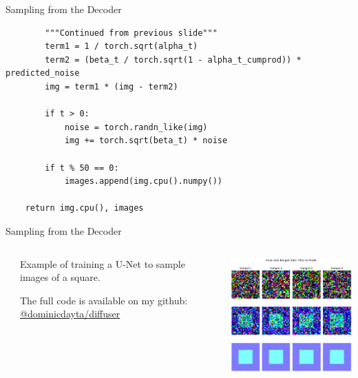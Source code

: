 \documentclass[aspectratio=169,xcolor=dvipsnames]{beamer}
\theoremstyle{named}
\begin{document}

\begin{frame}[fragile]{Sampling from the Decoder}
\scriptsize
\begin{lstlisting}
        """Continued from previous slide"""
        term1 = 1 / torch.sqrt(alpha_t)
        term2 = (beta_t / torch.sqrt(1 - alpha_t_cumprod)) * predicted_noise
        img = term1 * (img - term2)
        
        if t > 0:
            noise = torch.randn_like(img)
            img += torch.sqrt(beta_t) * noise
            
        if t % 50 == 0:
            images.append(img.cpu().numpy())
            
    return img.cpu(), images
\end{lstlisting}

\end{frame}


\begin{frame}{Sampling from the Decoder}

\begin{columns}[T]
    \begin{column}{0.05\textwidth}
        
    \end{column}
    \begin{column}{0.25\textwidth}
        \vspace{2em}
        
        \scriptsize
        Example of training a U-Net to sample images of a square.

        \vspace{1em}
        
        The full code is available on my github: \href{https://github.com/dominicdayta/diffuser}{@dominicdayta/diffuser}
        \normalsize
    \end{column}
    \begin{column}{0.7\textwidth}
        \centering
        \includegraphics[width=65mm]{squares.png}        
    \end{column}
\end{columns}

\end{frame}
\end{document}
